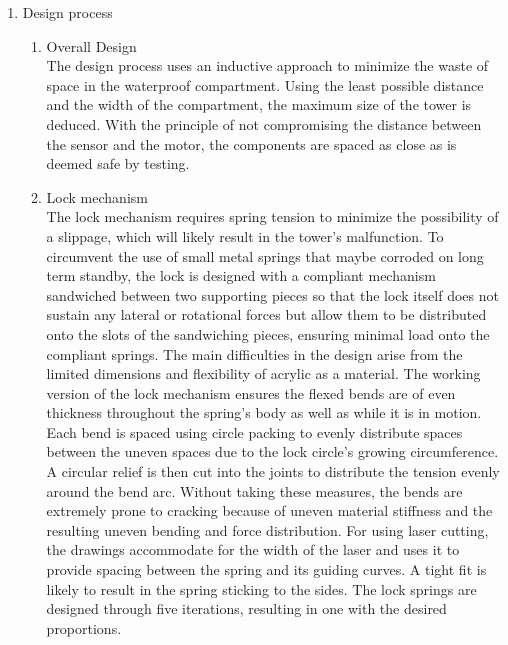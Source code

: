 \documentclass{article}[10pt]
\begin{document}
\begin{enumerate}
    \item Design process\\
    \begin{enumerate}
        \item Overall Design\\
        The design process uses an inductive approach to minimize the waste of space in the waterproof compartment. Using the least possible distance and the width of the compartment, the maximum size of the tower is deduced. With the principle of not compromising the distance between the sensor and the motor, the components are spaced as close as is deemed safe by testing.
        \item Lock mechanism\\
The lock mechanism requires spring tension to minimize the possibility of a slippage, which will likely result in the tower’s malfunction. To circumvent the use of small metal springs that maybe corroded on long term standby, the lock is designed with a compliant mechanism sandwiched between two supporting pieces so that the lock itself does not sustain any lateral or rotational forces but allow them to be distributed onto the slots of the sandwiching pieces, ensuring minimal load onto the compliant springs. 
The main difficulties in the design arise from the limited dimensions and flexibility of acrylic as a material. The working version of the lock mechanism ensures the flexed bends are of even thickness throughout the spring’s body as well as while it is in motion. Each bend is spaced using circle packing to evenly distribute spaces between the uneven spaces due to the lock circle’s growing circumference. A circular relief is then cut into the joints to distribute the tension evenly around the bend arc. Without taking these measures, the bends are extremely prone to cracking because of uneven material stiffness and the resulting uneven bending and force distribution. For using laser cutting, the drawings accommodate for the width of the laser and uses it to provide spacing between the spring and its guiding curves. A tight fit is likely to result in the spring sticking to the sides. The lock springs are designed through five iterations, resulting in one with the desired proportions.

    \end{enumerate}
    



    
\end{enumerate}
\end{document}
